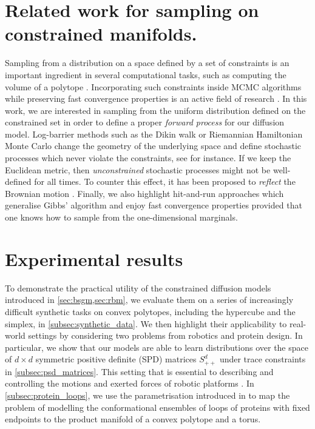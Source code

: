 \section{Related work for sampling on constrained manifolds.}
Sampling from a distribution on a space defined by a set of constraints is an important ingredient in several computational tasks, such as computing the volume of a polytope \parencite{lee2017Geodesic}.
Incorporating such constraints inside MCMC algorithms while preserving fast convergence properties is an active field of research \parencite{kook2022sampling,lee2017Geodesic,noble2022Barrier}.
In this work, we are interested in sampling from the uniform distribution defined on the constrained set in order to define a proper \emph{forward process} for our diffusion model.
Log-barrier methods such as the Dikin walk or Riemannian Hamiltonian Monte Carlo \cite{Kannan2009,lee2017Geodesic,noble2022Barrier} change the geometry of the underlying space and define stochastic processes which never violate the constraints, see \cite{Kannan2009,noble2022Barrier} for instance.
If we keep the Euclidean metric, then \emph{unconstrained} stochastic processes might not be well-defined for all times.
To counter this effect, it has been proposed to \emph{reflect} the Brownian motion \cite{williams1987Reflected,petit1997Time,shkolnikov2013Timereversal}.
Finally, we also highlight hit-and-run approaches \parencite{Smith1984,Lovasz2006} which generalise Gibbs' algorithm and enjoy fast convergence properties provided that one knows how to sample from the one-dimensional marginals.


\section{Experimental results}
\label{sec:experiments-constrained}
\label{sec:diff_methods}

To demonstrate the practical utility of the constrained diffusion models introduced in \cref{sec:bsgm,sec:rbm}, we evaluate them on a series of increasingly difficult synthetic tasks on convex polytopes, including the hypercube and the simplex, in \cref{subsec:synthetic_data}.
We then highlight their applicability to real-world settings by considering two problems from robotics and protein design.
In particular, we show that our models are able to learn distributions over the space of \(d\times d\) symmetric positive definite (SPD) matrices \(S_{++}^d\) under trace constraints in \cref{subsec:psd_matrices}.
This setting that is essential to describing and controlling the motions and exerted forces of robotic platforms \parencite{yoshikawa1985manipulability}.
In \cref{subsec:protein_loops}, we use the parametrisation introduced in \textcite{han2006inverse} to map the problem of modelling the conformational ensembles of loops of proteins with fixed endpoints to the product manifold of a convex polytope and a torus.

